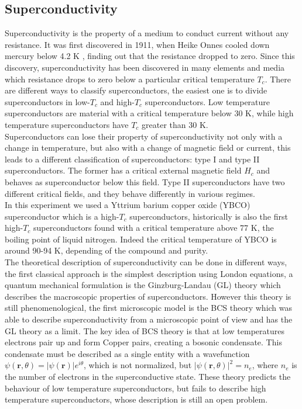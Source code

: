 \documentclass[a4paper,10pt]{article}
\begin{document}
\subsection{Superconductivity}
Superconductivity is the property of a medium to conduct current without any resistance. It was first discovered in 1911, when Heike Onnes cooled down mercury below 4.2 K \cite{firstsuperconductor}, finding out that the resistance dropped to zero. Since this discovery, superconductivity has been discovered in many elements and media which resistance drops to zero below a particular critical temperature $T_c$. There are different ways to classify superconductors, the easiest one is to divide superconductors in low-$T_c$ and high-$T_c$ superconductors. Low temperature superconductors are material with a critical temperature below $30$ K, while high temperature superconductors have $T_c$ greater than 30 K.\\
Superconductors can lose their property of superconductivity not only with a change in temperature, but also with a change of magnetic field or current, this leads to a different classification of superconductors: type I and type II superconductors. The former has a critical external magnetic field $H_c$ and behaves as superconductor below this field. Type II superconductors have two different critical fields, and they behave differently in various regimes.\\
In this experiment we used a Yttrium barium copper oxide (YBCO) superconductor which is a high-$T_c$ superconductors, historically is also the first high-$T_c$ superconductors found with a critical temperature above 77 K, the boiling point of liquid nitrogen. Indeed the critical temperature of YBCO is around 90-94 K, depending of the compound and purity.\\
The theoretical description of superconductivity can be done in different ways, the first classical approach is the simplest description using London equations, a quantum mechanical formulation is the Ginzburg-Landau (GL) theory which describes the macroscopic properties of superconductors. However this theory is still phenomenological, the first microscopic model is the BCS theory which was able to describe superconductivity from a microscopic point of view and has the GL theory as a limit. The key idea of BCS theory is that at low temperatures electrons pair up and form Copper pairs, creating a bosonic condensate. This condensate must be described as a single entity with a wavefunction $\psi(\mathbf{r},\theta) = |\psi(\mathbf{r})| e^{i\theta}$, which is not normalized, but $|\psi(\mathbf{r},\theta)|^2 = n_e$, where $n_e$ is the number of electrons in the superconductive state. These theory predicts the behaviour of low temperature superconductors, but fails to describe high temperature superconductors, whose description is still an open problem.
\end{document}
